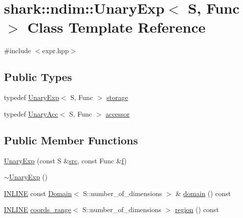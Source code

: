 \hypertarget{classshark_1_1ndim_1_1_unary_exp}{}\section{shark\+:\+:ndim\+:\+:Unary\+Exp$<$ S, Func $>$ Class Template Reference}
\label{classshark_1_1ndim_1_1_unary_exp}


{\ttfamily \#include $<$expr.\+hpp$>$}

\subsection*{Public Types}
\begin{DoxyCompactItemize}
\item 
typedef \hyperlink{classshark_1_1ndim_1_1_unary_exp}{Unary\+Exp}$<$ S, Func $>$ \hyperlink{classshark_1_1ndim_1_1_unary_exp_aff41674c204a5df02b79b518efa8ea5b}{storage}
\item 
typedef \hyperlink{classshark_1_1ndim_1_1_unary_acc}{Unary\+Acc}$<$ S, Func $>$ \hyperlink{classshark_1_1ndim_1_1_unary_exp_aa34e1f563bfcee209cd2c1886fe7320f}{accessor}
\end{DoxyCompactItemize}
\subsection*{Public Member Functions}
\begin{DoxyCompactItemize}
\item 
\hyperlink{classshark_1_1ndim_1_1_unary_exp_a5b4b3528aa72c169b82dbd699ddbdf5f}{Unary\+Exp} (const S \&\hyperlink{classshark_1_1ndim_1_1_unary_exp_ad43011a53ffbee999334c7cc52fb95ad}{src}, const Func \&\hyperlink{classshark_1_1ndim_1_1_unary_exp_a7d3fe16a63fc7e035839407f24b586b9}{f})
\item 
\hyperlink{classshark_1_1ndim_1_1_unary_exp_a602b169be3f0bda9f2d668daf01e5ca2}{$\sim$\+Unary\+Exp} ()
\item 
\hyperlink{common_8hpp_a2eb6f9e0395b47b8d5e3eeae4fe0c116}{I\+N\+L\+I\+NE} const \hyperlink{classshark_1_1ndim_1_1_domain}{Domain}$<$ S\+::number\+\_\+of\+\_\+dimensions $>$ \& \hyperlink{classshark_1_1ndim_1_1_unary_exp_a87bc70f88d3c8d535984595b20e4def3}{domain} () const
\item 
\hyperlink{common_8hpp_a2eb6f9e0395b47b8d5e3eeae4fe0c116}{I\+N\+L\+I\+NE} \hyperlink{structshark_1_1ndim_1_1coords__range}{coords\+\_\+range}$<$ S\+::number\+\_\+of\+\_\+dimensions $>$ \hyperlink{classshark_1_1ndim_1_1_unary_exp_ab5cbee53029546b1c0f87f98c4f34616}{region} () const
\end{DoxyCompactItemize}
